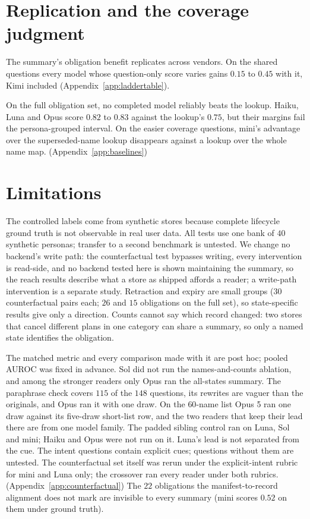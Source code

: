 \documentclass{article}
\begin{document}
\section{Replication and the coverage judgment}\label{sec:populations}\label{sec:replication}\label{sec:calibration}\label{sec:coverage}\label{sec:discrimination}\label{sec:calibration-secondary}\label{sec:ladder}
The summary's obligation benefit replicates across vendors. On the shared questions every model whose question-only score varies gains $0.15$ to $0.45$ with it, Kimi included (Appendix~\ref{app:laddertable}).

On the full obligation set, no completed model reliably beats the lookup. Haiku, Luna and Opus score $0.82$ to $0.83$ against the lookup's $0.75$, but their margins fail the persona-grouped interval. On the easier coverage questions, mini's advantage over the superseded-name lookup disappears against a lookup over the whole name map. (Appendix~\ref{app:baselines})

\section{Limitations}\label{sec:limitations}\label{sec:discussion}
The controlled labels come from synthetic stores because complete lifecycle ground truth is not observable in real user data. All tests use one bank of $40$ synthetic personas; transfer to a second benchmark is untested. We change no backend's write path: the counterfactual test bypasses writing, every intervention is read-side, and no backend tested here is shown maintaining the summary, so the reach results describe what a store as shipped affords a reader; a write-path intervention is a separate study. Retraction and expiry are small groups ($30$ counterfactual pairs each; $26$ and $15$ obligations on the full set), so state-specific results give only a direction. Counts cannot say which record changed: two stores that cancel different plans in one category can share a summary, so only a named state identifies the obligation.

The matched metric and every comparison made with it are post hoc; pooled AUROC was fixed in advance. Sol did not run the names-and-counts ablation, and among the stronger readers only Opus ran the all-states summary. The paraphrase check covers $115$ of the $148$ questions, its rewrites are vaguer than the originals, and Opus ran it with one draw. On the $60$-name list Opus 5 ran one draw against its five-draw short-list row, and the two readers that keep their lead there are from one model family. The padded sibling control ran on Luna, Sol and mini; Haiku and Opus were not run on it. Luna's lead is not separated from the cue. The intent questions contain explicit cues; questions without them are untested.
The counterfactual set itself was rerun under the explicit-intent rubric for mini and Luna only; the crossover ran every reader under both rubrics. (Appendix~\ref{app:counterfactual}) The $22$ obligations the manifest-to-record alignment does not mark are invisible to every summary (mini scores $0.52$ on them under ground truth).
\end{document}
